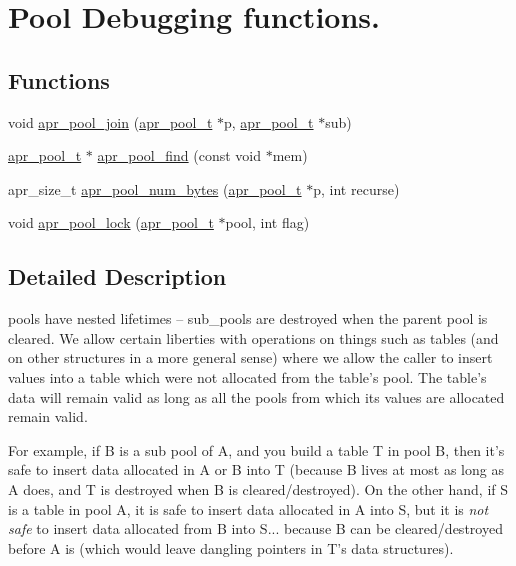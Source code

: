 \hypertarget{group___pool_debug}{\section{Pool Debugging functions.}
\label{group___pool_debug}
}
\subsection*{Functions}
\begin{DoxyCompactItemize}
\item 
void \hyperlink{group___pool_debug_gaecd956092f81c70117507ad8cbca8ea7}{apr\-\_\-pool\-\_\-join} (\hyperlink{group__apr__pools_gaf137f28edcf9a086cd6bc36c20d7cdfb}{apr\-\_\-pool\-\_\-t} $\ast$p, \hyperlink{group__apr__pools_gaf137f28edcf9a086cd6bc36c20d7cdfb}{apr\-\_\-pool\-\_\-t} $\ast$sub)
\item 
\hyperlink{group__apr__pools_gaf137f28edcf9a086cd6bc36c20d7cdfb}{apr\-\_\-pool\-\_\-t} $\ast$ \hyperlink{group___pool_debug_ga0bc40d9069709020e3643492dae2ccb0}{apr\-\_\-pool\-\_\-find} (const void $\ast$mem)
\item 
apr\-\_\-size\-\_\-t \hyperlink{group___pool_debug_ga22462da23d70dfde389a370b131cd351}{apr\-\_\-pool\-\_\-num\-\_\-bytes} (\hyperlink{group__apr__pools_gaf137f28edcf9a086cd6bc36c20d7cdfb}{apr\-\_\-pool\-\_\-t} $\ast$p, int recurse)
\item 
void \hyperlink{group___pool_debug_ga24f8f0287478fa71f77d0ce4ec035e4a}{apr\-\_\-pool\-\_\-lock} (\hyperlink{group__apr__pools_gaf137f28edcf9a086cd6bc36c20d7cdfb}{apr\-\_\-pool\-\_\-t} $\ast$pool, int flag)
\end{DoxyCompactItemize}


\subsection{Detailed Description}
pools have nested lifetimes -- sub\-\_\-pools are destroyed when the parent pool is cleared. We allow certain liberties with operations on things such as tables (and on other structures in a more general sense) where we allow the caller to insert values into a table which were not allocated from the table's pool. The table's data will remain valid as long as all the pools from which its values are allocated remain valid.

For example, if B is a sub pool of A, and you build a table T in pool B, then it's safe to insert data allocated in A or B into T (because B lives at most as long as A does, and T is destroyed when B is cleared/destroyed). On the other hand, if S is a table in pool A, it is safe to insert data allocated in A into S, but it is {\itshape not safe} to insert data allocated from B into S... because B can be cleared/destroyed before A is (which would leave dangling pointers in T's data structures).

